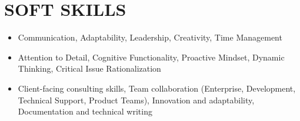 \documentclass[a4paper,12pt]{article}
\begin{document}
\section*{SOFT SKILLS}
\begin{itemize}[label=-]
    \item Communication, Adaptability, Leadership, Creativity, Time Management
    \item Attention to Detail, Cognitive Functionality, Proactive Mindset, Dynamic Thinking, Critical Issue Rationalization
    \item Client-facing consulting skills, Team collaboration (Enterprise, Development, Technical Support, Product Teams), Innovation and adaptability, Documentation and technical writing
\end{itemize}
\end{document}
